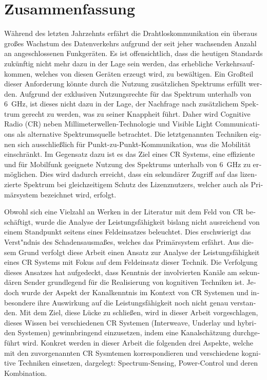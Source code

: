 \chapter*{Zusammenfassung}
\begin{otherlanguage}{german}
W\"ahrend des letzten Jahrzehnts erf\"ahrt die Drahtloskommunikation ein \"uberaus gro\ss es Wachstum des Datenverkehrs aufgrund der seit jeher wachsenden Anzahl an angeschlossenen Funkger\"aten. Es ist offensichtlich, dass die heutigen Standards zuk\"unftig nicht mehr dazu in der Lage sein werden, das erhebliche Verkehrsaufkommen, welches von diesen Ger\"aten erzeugt wird, zu bew\"altigen. Ein Gro\ss teil dieser Anforderung k\"onnte durch die Nutzung zus\"atzlichen Spektrums erf\"ullt werden. Aufgrund der exklusiven Nutzungsrechte f\"ur das Spektrum unterhalb von \SI{6}{GHz}, ist dieses nicht dazu in der Lage, der Nachfrage nach zus\"atzlichem Spektrum gerecht zu werden, was zu seiner Knappheit f\"uhrt. Daher wird Cognitive Radio (CR) neben Millimeterwellen-Technologie und Visible Light Communications als alternative Spektrumsquelle betrachtet. Die letztgenannten Techniken eignen sich ausschlie\ss lich f\"ur Punkt-zu-Punkt-Kommunikation, was die Mobilit\"at einschr\"ankt. Im Gegensatz dazu ist es das Ziel eines CR Systems, eine effiziente und f\"ur Mobilfunk geeignete Nutzung des Spektrums unterhalb von \SI{6}{GHz} zu erm\"oglichen. Dies wird dadurch erreicht, dass ein sekund\"arer Zugriff auf das lizenzierte Spektrum bei gleichzeitigem Schutz des Lizenznutzers, welcher auch als Prim\"arsystem bezeichnet wird, erfolgt. 

Obwohl sich eine Vielzahl an Werken in der Literatur mit dem Feld von CR besch\"aftigt, wurde die Analyse der Leistungsf\"ahigkeit bislang nicht ausreichend von einem Standpunkt seitens eines Feldeinsatzes beleuchtet. Dies erschwierigt das Verst\a"ndnis des Schadensausma\ss es, welches das Prim\"arsystem erf\"ahrt. Aus diesem Grund verfolgt diese Arbeit einen Ansatz zur Analyse der Leistungsf\"ahigkeit eines CR Systems mit Fokus auf dem Feldeinsatz dieser Technik. Die Verfolgung dieses Ansatzes hat aufgedeckt, dass Kenntnis der involvierten Kan\"ale am sekund\"aren Sender grundlegend f\"ur die Realisierung von kognitiven Techniken ist. Jedoch wurde der Aspekt der Kanalkenntnis im Kontext von CR Systemen und inbesondere ihre Auswirkung auf die Leistungsf\"ahigkeit noch nicht genau verstanden. Mit dem Ziel, diese L\"ucke zu schlie\ss en, wird in dieser Arbeit vorgeschlagen, dieses Wissen bei verschiedenen CR Systemen (Interweave, Underlay und hybriden Systemen) gewinnbringend einzusetzen, indem eine Kanalsch\"atzung durchgef\"uhrt wird. Konkret werden in dieser Arbeit die folgenden drei Aspekte, welche mit den zuvorgenannten CR Sysmtemen korrespondieren und verschiedene kognitive Techniken einsetzen, dargelegt: Spectrum-Sensing, Power-Control und deren Kombination.


\end{otherlanguage}
